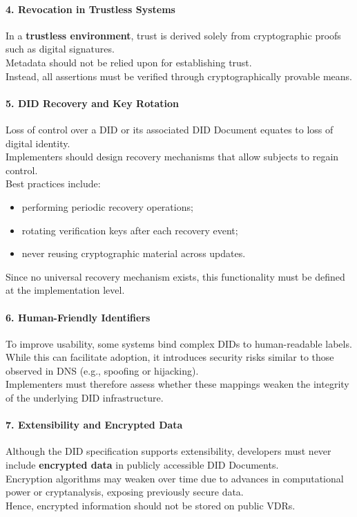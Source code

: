 \paragraph{4. Revocation in Trustless Systems}
In a \textbf{trustless environment}, trust is derived solely from cryptographic proofs such as digital signatures.\\ 
Metadata should not be relied upon for establishing trust.\\  
Instead, all assertions must be verified through cryptographically provable means.

\paragraph{5. DID Recovery and Key Rotation}
Loss of control over a DID or its associated DID Document equates to loss of digital identity.\\
Implementers should design recovery mechanisms that allow subjects to regain control.\\
Best practices include:
\begin{itemize}
    \item performing periodic recovery operations;
    \item rotating verification keys after each recovery event;
    \item never reusing cryptographic material across updates.
\end{itemize}
Since no universal recovery mechanism exists, this functionality must be defined at the implementation level.

\paragraph{6. Human-Friendly Identifiers}
To improve usability, some systems bind complex DIDs to human-readable labels.\\
While this can facilitate adoption, it introduces security risks similar to those observed in DNS (e.g., spoofing or hijacking).\\
Implementers must therefore assess whether these mappings weaken the integrity of the underlying DID infrastructure.

\paragraph{7. Extensibility and Encrypted Data}
Although the DID specification supports extensibility, developers must never include \textbf{encrypted data} in publicly accessible DID Documents.\\
Encryption algorithms may weaken over time due to advances in computational power or cryptanalysis, exposing previously secure data.\\
Hence, encrypted information should not be stored on public VDRs.

